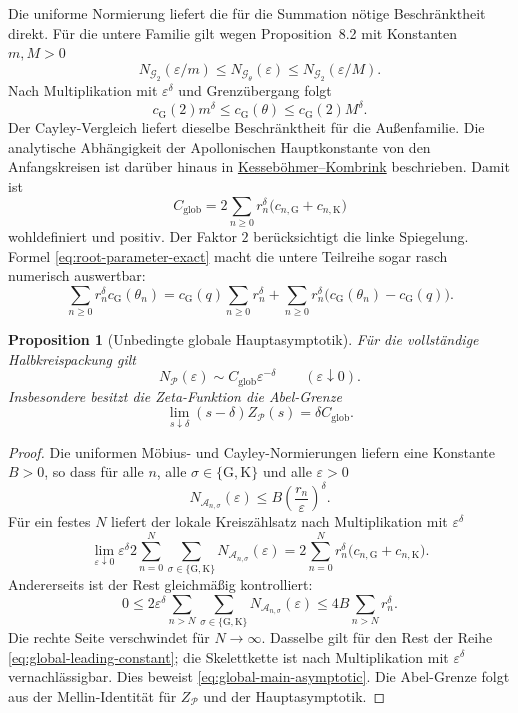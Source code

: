 \documentclass[11pt,a4paper]{article}
\newtheorem{proposition}[remark]{Proposition}
\begin{document}
Die uniforme Normierung liefert die für die Summation nötige
Beschränktheit direkt. Für die untere Familie gilt wegen
Proposition~8.2 mit Konstanten $m,M>0$
\[
 N_{\mathcal G_2}(\varepsilon/m)
 \le N_{\mathcal G_\theta}(\varepsilon)
 \le N_{\mathcal G_2}(\varepsilon/M).
\]
Nach Multiplikation mit $\varepsilon^\delta$ und Grenzübergang folgt
\[
 c_{\mathrm G}(2)m^\delta
 \le c_{\mathrm G}(\theta)
 \le c_{\mathrm G}(2)M^\delta.
\]
Der Cayley-Vergleich liefert dieselbe Beschränktheit für die Außenfamilie.
Die analytische Abhängigkeit der Apollonischen Hauptkonstante von den
Anfangskreisen ist darüber hinaus in
\href{https://arxiv.org/abs/1702.02854}{Kesseböhmer--Kombrink}
beschrieben. Damit ist
\begin{equation}\label{eq:global-leading-constant}
 C_{\mathrm{glob}}
 =2\sum_{n\ge0}r_n^\delta
   \bigl(c_{n,\mathrm G}+c_{n,\mathrm K}\bigr)
\end{equation}
wohldefiniert und positiv. Der Faktor $2$ berücksichtigt die linke
Spiegelung. Formel \eqref{eq:root-parameter-exact} macht die untere
Teilreihe sogar rasch numerisch auswertbar:
\[
 \sum_{n\ge0}r_n^\delta c_{\mathrm G}(\theta_n)
 =c_{\mathrm G}(q)\sum_{n\ge0}r_n^\delta
  +\sum_{n\ge0}r_n^\delta
   \bigl(c_{\mathrm G}(\theta_n)-c_{\mathrm G}(q)\bigr).
\]

\begin{proposition}[Unbedingte globale Hauptasymptotik]
Für die vollständige Halbkreispackung gilt
\begin{equation}\label{eq:global-main-asymptotic}
 N_{\mathcal P}(\varepsilon)
 \sim C_{\mathrm{glob}}\varepsilon^{-\delta}
 \qquad(\varepsilon\downarrow0).
\end{equation}
Insbesondere besitzt die Zeta-Funktion die Abel-Grenze
\[
 \lim_{s\downarrow\delta}
 (s-\delta)Z_{\mathcal P}(s)=\delta C_{\mathrm{glob}}.
\]
\end{proposition}

\begin{proof}
Die uniformen Möbius- und Cayley-Normierungen liefern eine Konstante
$B>0$, so dass für alle $n$, alle $\sigma\in\{\mathrm G,\mathrm K\}$ und
alle $\varepsilon>0$
\[
 N_{\mathcal A_{n,\sigma}}(\varepsilon)
 \le B\left(\frac{r_n}{\varepsilon}\right)^\delta.
\]
Für ein festes $N$ liefert der lokale Kreiszählsatz nach Multiplikation mit
$\varepsilon^\delta$
\[
\lim_{\varepsilon\downarrow0}
\varepsilon^\delta
 2\sum_{n=0}^{N}\sum_{\sigma\in\{\mathrm G,\mathrm K\}}
 N_{\mathcal A_{n,\sigma}}(\varepsilon)
 =2\sum_{n=0}^{N}r_n^\delta
  \bigl(c_{n,\mathrm G}+c_{n,\mathrm K}\bigr).
\]
Andererseits ist der Rest gleichmäßig kontrolliert:
\[
 0\le 2\varepsilon^\delta
 \sum_{n>N}\sum_{\sigma\in\{\mathrm G,\mathrm K\}}
 N_{\mathcal A_{n,\sigma}}(\varepsilon)
 \le4B\sum_{n>N}r_n^\delta.
\]
Die rechte Seite verschwindet für $N\to\infty$. Dasselbe gilt für den Rest
der Reihe \eqref{eq:global-leading-constant}; die Skelettkette ist nach
Multiplikation mit $\varepsilon^\delta$ vernachlässigbar. Dies beweist
\eqref{eq:global-main-asymptotic}. Die Abel-Grenze folgt aus der
Mellin-Identität für $Z_{\mathcal P}$ und der Hauptasymptotik.
\end{proof}
\end{document}
